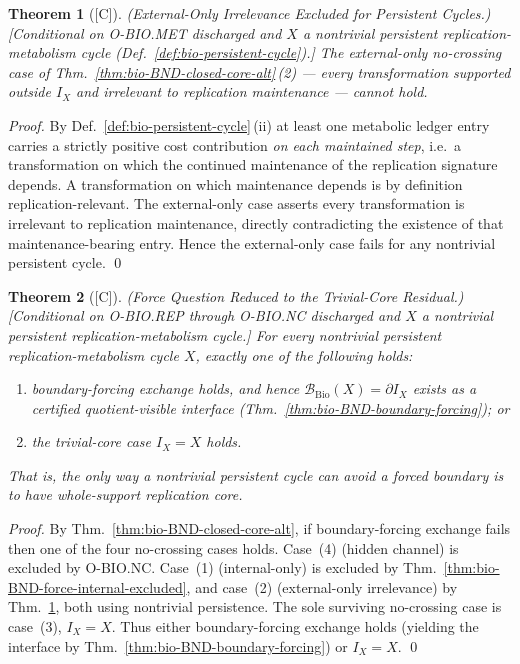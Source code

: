 \documentclass[12pt,oneside]{amsbook}
\theoremstyle{plain}
\newtheorem{theorem}{Theorem}[section]
\theoremstyle{definition}
\theoremstyle{remark}
\newcommand{\status}[1]{\textup{[#1]}}
\begin{document}
\begin{theorem}[\status{C}]\label{thm:bio-BND-force-external-excluded}
\textup{(External-Only Irrelevance Excluded for Persistent Cycles.)}
\textup{[Conditional on O-BIO.MET discharged and $X$ a nontrivial
persistent replication-metabolism cycle
(Def.~\ref{def:bio-persistent-cycle}).]}
The external-only no-crossing case of
Thm.~\ref{thm:bio-BND-closed-core-alt}\,(2) --- every
transformation supported outside $I_X$ and irrelevant to
replication maintenance --- cannot hold.
\end{theorem}

\begin{proof}
By Def.~\ref{def:bio-persistent-cycle}\,(ii) at least one
metabolic ledger entry carries a strictly positive cost contribution
\emph{on each maintained step}, i.e.\ a transformation on which the
continued maintenance of the replication signature depends.  A
transformation on which maintenance depends is by definition
replication-relevant.  The external-only case asserts every
transformation is irrelevant to replication maintenance, directly
contradicting the existence of that maintenance-bearing entry.
Hence the external-only case fails for any nontrivial persistent
cycle. \qed
\end{proof}

\begin{theorem}[\status{C}]\label{thm:bio-BND-force-reduced}
\textup{(Force Question Reduced to the Trivial-Core Residual.)}
\textup{[Conditional on O-BIO.REP through O-BIO.NC discharged and
$X$ a nontrivial persistent replication-metabolism cycle.]}
For every nontrivial persistent replication-metabolism cycle $X$,
exactly one of the following holds:
\begin{enumerate}[label=\textup{(\alph*)}]
  \item boundary-forcing exchange holds, and hence
    $\mathcal{B}_{\mathrm{Bio}}(X) = \partial I_X$ exists as a
    certified quotient-visible interface
    (Thm.~\ref{thm:bio-BND-boundary-forcing}); or
  \item the trivial-core case $I_X = X$ holds.
\end{enumerate}
That is, the only way a nontrivial persistent cycle can avoid a
forced boundary is to have whole-support replication core.
\end{theorem}

\begin{proof}
By Thm.~\ref{thm:bio-BND-closed-core-alt}, if boundary-forcing
exchange fails then one of the four no-crossing cases holds.  Case~(4)
(hidden channel) is excluded by O-BIO.NC.  Case~(1) (internal-only)
is excluded by Thm.~\ref{thm:bio-BND-force-internal-excluded}, and
case~(2) (external-only irrelevance) by
Thm.~\ref{thm:bio-BND-force-external-excluded}, both using
nontrivial persistence.  The sole surviving no-crossing case is
case~(3), $I_X = X$.  Thus either boundary-forcing exchange holds
(yielding the interface by
Thm.~\ref{thm:bio-BND-boundary-forcing}) or $I_X = X$. \qed
\end{proof}
\end{document}
